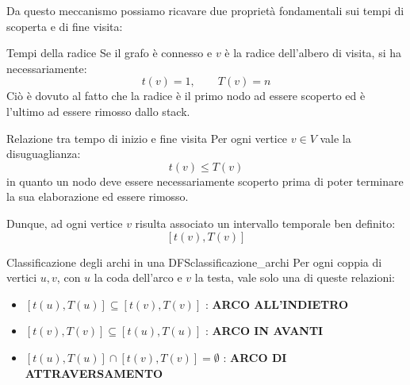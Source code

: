 \documentclass[12pt]{report}
\begin{document}
	Da questo meccanismo possiamo ricavare due proprietà fondamentali sui tempi di scoperta e di fine visita:
	
	\begin{osservazione}{Tempi della radice}{}
		Se il grafo è connesso e $v$ è la radice dell'albero di visita, si ha necessariamente:
		\[
		t(v) = 1, \qquad T(v) = n
		\]
		Ciò è dovuto al fatto che la radice è il primo nodo ad essere scoperto ed è l'ultimo ad essere rimosso dallo stack.
	\end{osservazione}
	
	\begin{osservazione}{Relazione tra tempo di inizio e fine visita}{}
		Per ogni vertice $v \in V$ vale la disuguaglianza:
		\[
		t(v) \le T(v)
		\]
		in quanto un nodo deve essere necessariamente scoperto prima di poter terminare la sua elaborazione ed essere rimosso.
	\end{osservazione}
	
	Dunque, ad ogni vertice $v$ risulta associato un intervallo temporale ben definito:
	\[
		[t(v), T(v)]
	\]
	
	\begin{proposizione}{Classificazione degli archi in una DFS}{classificazione_archi}
		Per ogni coppia di vertici $u, v$, con $u$ la coda dell'arco e $v$ la testa, vale solo una di queste relazioni:
		\begin{itemize}
			\item[\textbf{i)}] $[t(u), T(u)] \subseteq [t(v), T(v)]$ : \textbf{ARCO ALL'INDIETRO}
			\item[\textbf{ii)}] $[t(v), T(v)] \subseteq [t(u), T(u)]$ : \textbf{ARCO IN AVANTI}
			\item[\textbf{iii)}] $[t(u), T(u)] \cap [t(v), T(v)] = \emptyset$ : \textbf{ARCO DI ATTRAVERSAMENTO}
		\end{itemize}
	\end{proposizione}
	
\end{document}
